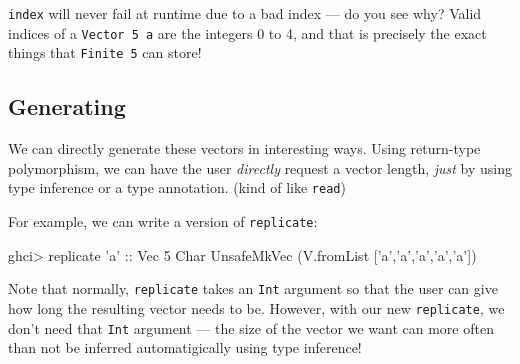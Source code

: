 \documentclass[]{article}
\newenvironment{Shaded}{}{}
\newcommand{\KeywordTok}[1]{\textcolor[rgb]{0.00,0.44,0.13}{\textbf{#1}}}
\newcommand{\DataTypeTok}[1]{\textcolor[rgb]{0.56,0.13,0.00}{#1}}
\newcommand{\DecValTok}[1]{\textcolor[rgb]{0.25,0.63,0.44}{#1}}
\newcommand{\CharTok}[1]{\textcolor[rgb]{0.25,0.44,0.63}{#1}}
\newcommand{\CommentTok}[1]{\textcolor[rgb]{0.38,0.63,0.69}{\textit{#1}}}
\newcommand{\OtherTok}[1]{\textcolor[rgb]{0.00,0.44,0.13}{#1}}
\newcommand{\FunctionTok}[1]{\textcolor[rgb]{0.02,0.16,0.49}{#1}}
\newcommand{\NormalTok}[1]{#1}
\begin{document}
\texttt{index} will never fail at runtime due to a bad index --- do you see why?
Valid indices of a \texttt{Vector\ 5\ a} are the integers 0 to 4, and that is
precisely the exact things that \texttt{Finite\ 5} can store!

\subsection{Generating}\label{generating}

We can directly generate these vectors in interesting ways. Using return-type
polymorphism, we can have the user \emph{directly} request a vector length,
\emph{just} by using type inference or a type annotation. (kind of like
\texttt{read})

For example, we can write a version of \texttt{replicate}:

\begin{Shaded}
\end{Shaded}

\begin{Shaded}
\begin{Highlighting}[]
\NormalTok{ghci}\FunctionTok{>}\NormalTok{ replicate }\CharTok{'a'}\OtherTok{ ::} \DataTypeTok{Vec} \DecValTok{5} \DataTypeTok{Char}
\DataTypeTok{UnsafeMkVec}\NormalTok{ (V.fromList [}\CharTok{'a'}\NormalTok{,}\CharTok{'a'}\NormalTok{,}\CharTok{'a'}\NormalTok{,}\CharTok{'a'}\NormalTok{,}\CharTok{'a'}\NormalTok{])}
\end{Highlighting}
\end{Shaded}

Note that normally, \texttt{replicate} takes an \texttt{Int} argument so that
the user can give how long the resulting vector needs to be. However, with our
new \texttt{replicate}, we don't need that \texttt{Int} argument --- the size of
the vector we want can more often than not be inferred automatigically using
type inference!
\end{document}
